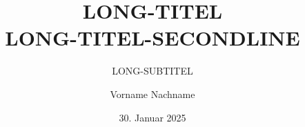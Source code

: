 \title[SHORT-TITLE]{LONG-TITEL\\LONG-TITEL-SECONDLINE}
\subtitle[SHORT-SUBTITEL]{LONG-SUBTITEL} 
\author{Vorname Nachname}
\newcommand{\faculty}{FACULTY}
\newcommand{\university}{HTWK Leipzig}
\newcommand{\universityLong}{Hochschule für Technik, Wirtschaft und Kultur Leipzig}
\date{30. Januar 2025}

